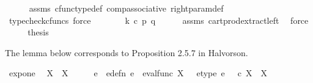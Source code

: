 \begin{isabellebody}
\ \ \ \ \isamarkupfalse%
\ assms\ cfunc{\isacharunderscore}{\kern0pt}type{\isacharunderscore}{\kern0pt}def\ comp{\isacharunderscore}{\kern0pt}associative\ right{\isacharunderscore}{\kern0pt}param{\isacharunderscore}{\kern0pt}def{}\ \isamarkupfalse%
\ {\isacharparenleft}{\kern0pt}typecheck{\isacharunderscore}{\kern0pt}cfuncs{\isacharcomma}{\kern0pt}\ force{\isacharparenright}{\kern0pt}\isanewline
\ \ \isamarkupfalse%
\ \isamarkupfalse%
\ {\isachardoublequoteopen}{\isachardot}{\kern0pt}{\isachardot}{\kern0pt}{\isachardot}{\kern0pt}\ {\isacharequal}{\kern0pt}\ k\ {\isasymcirc}\isactrlsub c\ {\isasymlangle}p{\isacharcomma}{\kern0pt}\ q{\isasymrangle}{\isachardoublequoteclose}\isanewline
\ \ \ \ \isamarkupfalse%
\ assms{\isacharparenleft}{\kern0pt}{}{\isacharcomma}{\kern0pt}{}{\isacharparenright}{\kern0pt}\ cart{\isacharunderscore}{\kern0pt}prod{\isacharunderscore}{\kern0pt}extract{\isacharunderscore}{\kern0pt}left\ \isamarkupfalse%
\ force\isanewline
\ \ \isamarkupfalse%
\ \isamarkupfalse%
\ {\isacharquery}{\kern0pt}thesis\isacommand{{\isachardot}{\kern0pt}}\isamarkupfalse%
\isanewline
{}\isamarkupfalse%
%
\endisatagproof
{\isafoldproof}%
%
\isadelimproof
%
\endisadelimproof
%
\isadelimdocument
%
\endisadelimdocument
%
\isatagdocument
%
\isamarkuptrue%
%
\endisatagdocument
{\isafolddocument}%
%
\isadelimdocument
%
\endisadelimdocument
%
\begin{isamarkuptext}%
The lemma below corresponds to Proposition 2.5.7 in Halvorson.%
\end{isamarkuptext}\isamarkuptrue%
\isamarkupfalse%
\ exp{\isacharunderscore}{\kern0pt}one{\isacharcolon}{\kern0pt}\isanewline
\ \ {\isachardoublequoteopen}X\isactrlbsup {\isasymone}\isactrlesup \ {\isasymcong}\ X{\isachardoublequoteclose}\isanewline
%
\isadelimproof
%
\endisadelimproof
%
\isatagproof
{}\isamarkupfalse%
\ {\isacharminus}{\kern0pt}\isanewline
\ \ \isamarkupfalse%
\ e\ \ e{\isacharunderscore}{\kern0pt}defn{\isacharcolon}{\kern0pt}\ {\isachardoublequoteopen}e\ {\isacharequal}{\kern0pt}\ eval{\isacharunderscore}{\kern0pt}func\ X\ {\isasymone}{\isachardoublequoteclose}\ \ e{\isacharunderscore}{\kern0pt}type{\isacharcolon}{\kern0pt}\ {\isachardoublequoteopen}e\ {\isacharcolon}{\kern0pt}\ {\isasymone}\ {\isasymtimes}\isactrlsub c\ X\isactrlbsup {\isasymone}\isactrlesup \ {\isasymrightarrow}\ X{\isachardoublequoteclose}\isanewline

\end{isabellebody}
